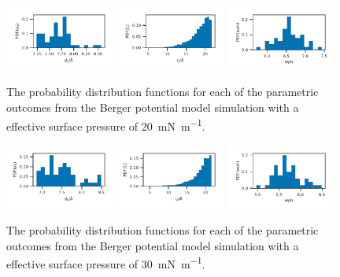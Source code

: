 \documentclass[amsmath,amssymb,superscriptaddress]{revtex4-1}
\begin{document}
%
%
\begin{figure}
 \centering
 \includegraphics[width=0.32\textwidth]{berger_20_dh}
 \includegraphics[width=0.32\textwidth]{berger_20_tt}
 \includegraphics[width=0.32\textwidth]{berger_20_wph}
 \caption{The probability distribution functions for each of the parametric outcomes from the Berger potential model simulation with a effective surface pressure of \SI{20}{\milli\newton\per\meter}.}
 \label{fig:be20}
\end{figure}
%
%
\begin{figure}
 \centering
 \includegraphics[width=0.32\textwidth]{berger_30_dh}
 \includegraphics[width=0.32\textwidth]{berger_30_tt}
 \includegraphics[width=0.32\textwidth]{berger_30_wph}
 \caption{The probability distribution functions for each of the parametric outcomes from the Berger potential model simulation with a effective surface pressure of \SI{30}{\milli\newton\per\meter}.}
 \label{fig:be30}
\end{figure}
\end{document}
